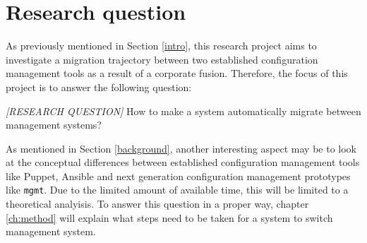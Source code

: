 \chapter{Research question}\label{ch:researchquestion}
As previously mentioned in Section \ref{intro}, this research project aims to investigate a migration trajectory between two established configuration management tools as a result of a corporate fusion. Therefore, the focus of this project is to answer the following question:

\textit{[RESEARCH QUESTION]}
How to make a system automatically migrate between management systems?

As mentioned in Section \ref{background}, another interesting aspect may be to look at the conceptual differences between established configuration management tools like Puppet, Ansible and next generation configuration management prototypes like \texttt{mgmt}. Due to the limited amount of available time, this will be limited to a theoretical analyisis. 
To answer this question in a proper way, chapter \ref{ch:method} will explain what steps need to be taken for a system to switch management system.
